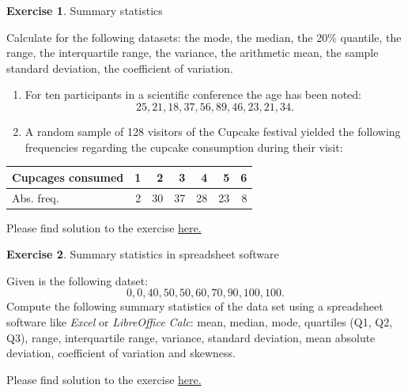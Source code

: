 \documentclass[
  12pt,
  oneside]{book}
\providecommand{\tightlist}{%
  \setlength{\itemsep}{0pt}\setlength{\parskip}{0pt}}
\theoremstyle{definition}
\theoremstyle{definition}
\theoremstyle{definition}
\newtheorem{exercise}{Exercise}[chapter]
\theoremstyle{definition}
\theoremstyle{remark}
\begin{document}
\begin{exercise}
\protect\hypertarget{exr:summarystatistics}{}\label{exr:summarystatistics}Summary statistics

Calculate for the following datasets: the mode, the median, the 20\% quantile, the range, the interquartile range, the variance, the arithmetic mean, the sample standard deviation, the coefficient of variation.

\begin{enumerate}
\def\labelenumi{\alph{enumi})}
\tightlist
\item
  For ten participants in a scientific conference the age
  has been noted: \[25, 21, 18, 37, 56, 89, 46, 23, 21, 34.\]
\item
  A random sample of 128 visitors of the Cupcake festival yielded the following frequencies regarding the cupcake consumption during their visit:
\end{enumerate}

\begin{longtable}[]{@{}lrrrrrr@{}}
\toprule\noalign{}
Cupcages consumed & 1 & 2 & 3 & 4 & 5 & 6 \\
\midrule\noalign{}
\endhead
\bottomrule\noalign{}
\endlastfoot
Abs. freq. & 2 & 30 & 37 & 28 & 23 & 8 \\
\end{longtable}

Please find solution to the exercise \protect\hyperlink{sol:summarystatistics}{here.}
\end{exercise}

\begin{exercise}
\protect\hypertarget{exr:destatexcel}{}\label{exr:destatexcel}Summary statistics in spreadsheet software

Given is the following datset: \[0, 0, 40, 50, 50, 60, 70, 90, 100, 100.\]
Compute the following summary statistics of the data set using a spreadsheet software like \textit{Excel} or \textit{LibreOffice Calc}:
mean, median, mode, quartiles (Q1, Q2, Q3), range, interquartile range, variance, standard deviation, mean absolute deviation, coefficient of variation and skewness.

Please find solution to the exercise \protect\hyperlink{sol:destatexcel}{here.}
\end{exercise}
\end{document}
